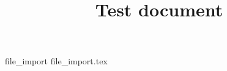 \documentclass[]{memoir}
\title{Test document}
\begin{document}
\maketitle




{file_import}
{file_import.tex}

\end{document}
